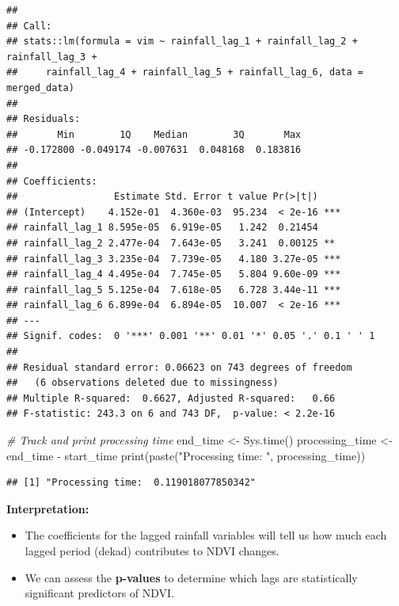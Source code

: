 \documentclass[
]{article}
\newenvironment{Shaded}{}{}
\newcommand{\CommentTok}[1]{\textcolor[rgb]{0.38,0.63,0.69}{\textit{#1}}}
\newcommand{\FunctionTok}[1]{\textcolor[rgb]{0.02,0.16,0.49}{#1}}
\newcommand{\NormalTok}[1]{#1}
\newcommand{\OtherTok}[1]{\textcolor[rgb]{0.00,0.44,0.13}{#1}}
\newcommand{\SpecialCharTok}[1]{\textcolor[rgb]{0.25,0.44,0.63}{#1}}
\newcommand{\StringTok}[1]{\textcolor[rgb]{0.25,0.44,0.63}{#1}}
\providecommand{\tightlist}{%
  \setlength{\itemsep}{0pt}\setlength{\parskip}{0pt}}
\begin{document}
\begin{verbatim}
## 
## Call:
## stats::lm(formula = vim ~ rainfall_lag_1 + rainfall_lag_2 + rainfall_lag_3 + 
##     rainfall_lag_4 + rainfall_lag_5 + rainfall_lag_6, data = merged_data)
## 
## Residuals:
##       Min        1Q    Median        3Q       Max 
## -0.172800 -0.049174 -0.007631  0.048168  0.183816 
## 
## Coefficients:
##                 Estimate Std. Error t value Pr(>|t|)    
## (Intercept)    4.152e-01  4.360e-03  95.234  < 2e-16 ***
## rainfall_lag_1 8.595e-05  6.919e-05   1.242  0.21454    
## rainfall_lag_2 2.477e-04  7.643e-05   3.241  0.00125 ** 
## rainfall_lag_3 3.235e-04  7.739e-05   4.180 3.27e-05 ***
## rainfall_lag_4 4.495e-04  7.745e-05   5.804 9.60e-09 ***
## rainfall_lag_5 5.125e-04  7.618e-05   6.728 3.44e-11 ***
## rainfall_lag_6 6.899e-04  6.894e-05  10.007  < 2e-16 ***
## ---
## Signif. codes:  0 '***' 0.001 '**' 0.01 '*' 0.05 '.' 0.1 ' ' 1
## 
## Residual standard error: 0.06623 on 743 degrees of freedom
##   (6 observations deleted due to missingness)
## Multiple R-squared:  0.6627, Adjusted R-squared:   0.66 
## F-statistic: 243.3 on 6 and 743 DF,  p-value: < 2.2e-16
\end{verbatim}

\begin{Shaded}
\begin{Highlighting}[]
\CommentTok{\# Track and print processing time}
\NormalTok{end\_time }\OtherTok{\textless{}{-}} \FunctionTok{Sys.time}\NormalTok{()}
\NormalTok{processing\_time }\OtherTok{\textless{}{-}}\NormalTok{ end\_time }\SpecialCharTok{{-}}\NormalTok{ start\_time}
\FunctionTok{print}\NormalTok{(}\FunctionTok{paste}\NormalTok{(}\StringTok{"Processing time: "}\NormalTok{, processing\_time))}
\end{Highlighting}
\end{Shaded}

\begin{verbatim}
## [1] "Processing time:  0.119018077850342"
\end{verbatim}

\textbf{Interpretation:}

\begin{itemize}
\tightlist
\item
  The coefficients for the lagged rainfall variables will tell us how
  much each lagged period (dekad) contributes to NDVI changes.
\item
  We can assess the \textbf{p-values} to determine which lags are
  statistically significant predictors of NDVI.
\end{itemize}
\end{document}
